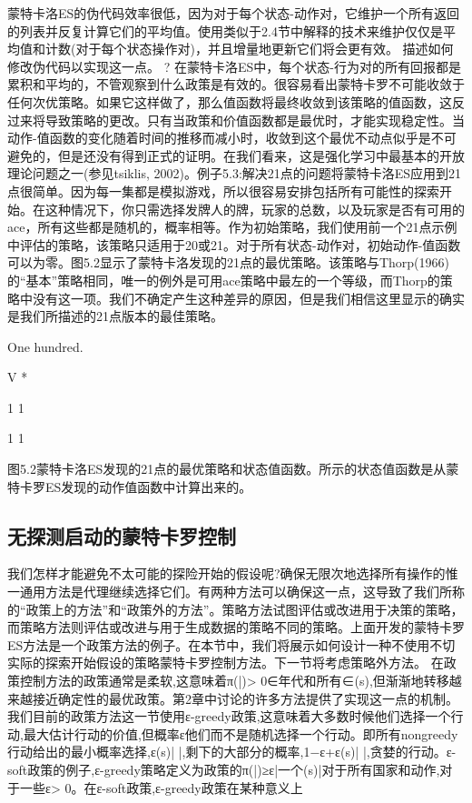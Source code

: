 蒙特卡洛ES的伪代码效率很低，因为对于每个状态-动作对，它维护一个所有返回的列表并反复计算它们的平均值。使用类似于2.4节中解释的技术来维护仅仅是平均值和计数(对于每个状态操作对)，并且增量地更新它们将会更有效。
描述如何修改伪代码以实现这一点。 					?
在蒙特卡洛ES中，每个状态-行为对的所有回报都是累积和平均的，不管观察到什么政策是有效的。很容易看出蒙特卡罗不可能收敛于任何次优策略。如果它这样做了，那么值函数将最终收敛到该策略的值函数，这反过来将导致策略的更改。只有当政策和价值函数都是最优时，才能实现稳定性。当动作-值函数的变化随着时间的推移而减小时，收敛到这个最优不动点似乎是不可避免的，但是还没有得到正式的证明。在我们看来，这是强化学习中最基本的开放理论问题之一(参见tsiklis, 2002)。例子5.3:解决21点的问题将蒙特卡洛ES应用到21点很简单。因为每一集都是模拟游戏，所以很容易安排包括所有可能性的探索开始。在这种情况下，你只需选择发牌人的牌，玩家的总数，以及玩家是否有可用的ace，所有这些都是随机的，概率相等。作为初始策略，我们使用前一个21点示例中评估的策略，该策略只适用于20或21。对于所有状态-动作对，初始动作-值函数可以为零。图5.2显示了蒙特卡洛发现的21点的最优策略。该策略与Thorp(1966)的“基本”策略相同，唯一的例外是可用ace策略中最左的一个等级，而Thorp的策略中没有这一项。我们不确定产生这种差异的原因，但是我们相信这里显示的确实是我们所描述的21点版本的最佳策略。

One hundred.


V *

1 1

1 1

图5.2蒙特卡洛ES发现的21点的最优策略和状态值函数。所示的状态值函数是从蒙特卡罗ES发现的动作值函数中计算出来的。

\subsection{无探测启动的蒙特卡罗控制}

我们怎样才能避免不太可能的探险开始的假设呢?确保无限次地选择所有操作的惟一通用方法是代理继续选择它们。有两种方法可以确保这一点，这导致了我们所称的“政策上的方法”和“政策外的方法”。策略方法试图评估或改进用于决策的策略，而策略方法则评估或改进与用于生成数据的策略不同的策略。上面开发的蒙特卡罗ES方法是一个政策方法的例子。在本节中，我们将展示如何设计一种不使用不切实际的探索开始假设的策略蒙特卡罗控制方法。下一节将考虑策略外方法。
在政策控制方法的政策通常是柔软,这意味着π(|)> 0∈年代和所有∈(s),但渐渐地转移越来越接近确定性的最优政策。第2章中讨论的许多方法提供了实现这一点的机制。我们目前的政策方法这一节使用ε-greedy政策,这意味着大多数时候他们选择一个行动,最大估计行动的价值,但概率ε他们而不是随机选择一个行动。即所有nongreedy行动给出的最小概率选择,ε(s)| |,剩下的大部分的概率,1−ε+ε(s)| |,贪婪的行动。ε-soft政策的例子,ε-greedy策略定义为政策的π(|)≥ε|一个(s)|对于所有国家和动作,对于一些ε> 0。在ε-soft政策,ε-greedy政策在某种意义上

